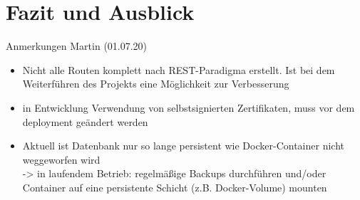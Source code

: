 \chapter{Fazit und Ausblick}
Anmerkungen Martin (01.07.20)
\begin{itemize}
	\item Nicht alle Routen komplett nach REST-Paradigma erstellt. Ist bei dem Weiterführen des Projekts eine Möglichkeit zur Verbesserung
	\item in Entwicklung Verwendung von selbstsignierten Zertifikaten, muss vor dem deployment geändert werden 
	\item Aktuell ist Datenbank nur so lange persistent wie Docker-Container nicht weggeworfen wird 
	\\ -> in laufendem Betrieb: regelmäßige Backups durchführen und/oder Container auf eine persistente Schicht (z.B. Docker-Volume) mounten
\end{itemize}
